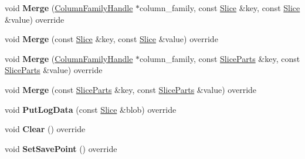 \begin{DoxyCompactItemize}
\item 
void {\bfseries Merge} (\hyperlink{classrocksdb_1_1ColumnFamilyHandle}{Column\+Family\+Handle} $\ast$column\+\_\+family, const \hyperlink{classrocksdb_1_1Slice}{Slice} \&key, const \hyperlink{classrocksdb_1_1Slice}{Slice} \&value) override\hypertarget{classrocksdb_1_1WriteBatch_a0ec4db669f3ab4bca0509120e7871dee}{}\label{classrocksdb_1_1WriteBatch_a0ec4db669f3ab4bca0509120e7871dee}

\item 
void {\bfseries Merge} (const \hyperlink{classrocksdb_1_1Slice}{Slice} \&key, const \hyperlink{classrocksdb_1_1Slice}{Slice} \&value) override\hypertarget{classrocksdb_1_1WriteBatch_ad5fd55fc593ad6e7048d3eaf9656925c}{}\label{classrocksdb_1_1WriteBatch_ad5fd55fc593ad6e7048d3eaf9656925c}

\item 
void {\bfseries Merge} (\hyperlink{classrocksdb_1_1ColumnFamilyHandle}{Column\+Family\+Handle} $\ast$column\+\_\+family, const \hyperlink{structrocksdb_1_1SliceParts}{Slice\+Parts} \&key, const \hyperlink{structrocksdb_1_1SliceParts}{Slice\+Parts} \&value) override\hypertarget{classrocksdb_1_1WriteBatch_ae4a4eb48935ae12473e1e5c13c8885d3}{}\label{classrocksdb_1_1WriteBatch_ae4a4eb48935ae12473e1e5c13c8885d3}

\item 
void {\bfseries Merge} (const \hyperlink{structrocksdb_1_1SliceParts}{Slice\+Parts} \&key, const \hyperlink{structrocksdb_1_1SliceParts}{Slice\+Parts} \&value) override\hypertarget{classrocksdb_1_1WriteBatch_ada4d221db658c339ac6007c8181b4972}{}\label{classrocksdb_1_1WriteBatch_ada4d221db658c339ac6007c8181b4972}

\item 
void {\bfseries Put\+Log\+Data} (const \hyperlink{classrocksdb_1_1Slice}{Slice} \&blob) override\hypertarget{classrocksdb_1_1WriteBatch_a568eb076fa8043cd4b35af6906d97e40}{}\label{classrocksdb_1_1WriteBatch_a568eb076fa8043cd4b35af6906d97e40}

\item 
void {\bfseries Clear} () override\hypertarget{classrocksdb_1_1WriteBatch_a458765844fd45fd960142f8bcb7cbcdd}{}\label{classrocksdb_1_1WriteBatch_a458765844fd45fd960142f8bcb7cbcdd}

\item 
void {\bfseries Set\+Save\+Point} () override\hypertarget{classrocksdb_1_1WriteBatch_a157a035c5b1edbac1f4dbcb34c4e8878}{}\label{classrocksdb_1_1WriteBatch_a157a035c5b1edbac1f4dbcb34c4e8878}


\end{DoxyCompactItemize}
